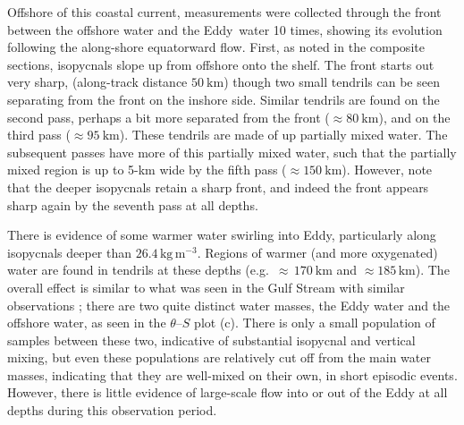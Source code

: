 \documentclass[draft]{agujournal2019}
\newcommand*{\Eddy}{{\sc Eddy}}
\begin{document}
Offshore of this coastal current, measurements were collected through the front between the offshore water and the \Eddy\ water 10 times, showing its evolution following the along-shore equatorward flow.  First, as noted in the composite sections, isopycnals slope up from offshore onto the shelf.  The front starts out very sharp, (along-track distance $50\ \mathrm{km}$) though two small tendrils can be seen separating from the front on the inshore side.  Similar tendrils are found on the second pass, perhaps a bit more separated from the front ($\approx 80\ \mathrm{km}$), and on the third pass ($\approx 95\ \mathrm{km}$).  These tendrils are made of up partially mixed water.  The subsequent passes have more of this partially mixed water, such that the partially mixed region is up to 5-km wide by the fifth pass ($\approx 150\ \mathrm{km}$).  However, note that the deeper isopycnals retain a sharp front, and indeed the front appears sharp again by the seventh pass at all depths.

There is evidence of some warmer water swirling into Eddy, particularly along isopycnals deeper than $26.4\,\mathrm{kg\,m^{-3}}$.  Regions of warmer (and more oxygenated) water are found in tendrils at these depths (e.g.\ $\approx\,170\ \mathrm{km}$ and $\approx 185\,\mathrm{km}$).  The overall effect is similar to what was seen in the Gulf Stream with similar observations \cite{klymaketal16}; there are two quite distinct water masses, the Eddy water and the offshore water, as seen in the $\theta$--$S$ plot (c). There is only a small population of samples between these two, indicative of substantial isopycnal and vertical mixing, but even these populations are relatively cut off from the main water masses, indicating that they are well-mixed on their own, in short episodic events.  However, there is little evidence of large-scale flow into or out of the Eddy at all depths during this observation period.
\end{document}
